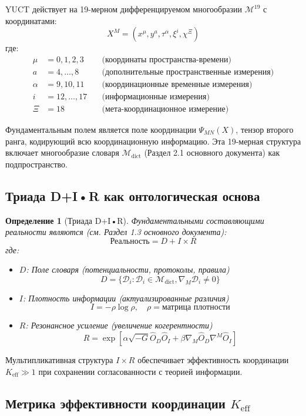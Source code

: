 \documentclass[12pt,a4paper]{article}
\newcommand{\Mdict}{\mathcal{M}_{\text{dict}}}
\newcommand{\Dict}{\mathcal{D}}
\newtheorem{definition}[theorem]{Определение}
\theoremstyle{remark}
\newcommand{\Keff}{K_{\mathrm{eff}}}
\begin{document}
	YUCT действует на 19-мерном дифференцируемом многообразии $\mathcal{M}^{19}$ с координатами:
	\[
	X^M = (x^\mu, y^a, \tau^\alpha, \xi^i, \chi^\Xi)
	\]
	где:
	\begin{align*}
		\mu &= 0,1,2,3 \quad &\text{(координаты пространства-времени)} \\
		a &= 4,\dots,8 \quad &\text{(дополнительные пространственные измерения)} \\
		\alpha &= 9,10,11 \quad &\text{(координационные временные измерения)} \\
		i &= 12,\dots,17 \quad &\text{(информационные измерения)} \\
		\Xi &= 18 \quad &\text{(мета-координационное измерение)}
	\end{align*}
	
	Фундаментальным полем является поле координации $\Psi_{MN}(X)$, тензор второго ранга, кодирующий всю координационную информацию. Эта 19-мерная структура включает многообразие словаря $\Mdict$ (Раздел 2.1 основного документа) как подпространство.
	
	\subsection{Триада D+I•R как онтологическая основа}
	
	\begin{definition}[Триада D+I•R]
		Фундаментальными составляющими реальности являются (см. Раздел 1.3 основного документа):
		\[
		\text{Реальность} = D + I \times R
		\]
		где:
		\begin{itemize}
			\item $D$: Поле словаря (потенциальности, протоколы, правила)
			\[
			D = \{\Dict_i : \Dict_i \in \Mdict, \nabla_M \Dict_i \neq 0\}
			\]
			\item $I$: Плотность информации (актуализированные различия)
			\[
			I = -\rho \log \rho, \quad \rho = \text{матрица плотности}
			\]
			\item $R$: Резонансное усиление (увеличение когерентности)
			\[
			R = \exp\left[\alpha \sqrt{-G} \hat{O}_D \hat{O}_I + \beta \nabla_M\hat{O}_D \nabla^M\hat{O}_I\right]
			\]
		\end{itemize}
	\end{definition}
	
	Мультипликативная структура $I \times R$ обеспечивает эффективность координации $\Keff \gg 1$ при сохранении согласованности с теорией информации.
	
	\subsection{Метрика эффективности координации $\Keff$}
	
\end{document}
